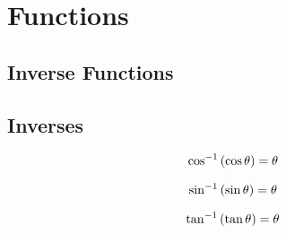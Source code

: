 \documentclass[20150903-160354-rs2.2-MarksMathNotebook.tex]{subfiles}
\begin{document}
%
%

\chapter{Functions}



\section{Inverse Functions}


\section{Inverses}


\begin{property}
\begin{subequations}
\begin{align}
\cos^{-1} \left(\cos \theta \right) = \theta \label{eq:arccos}
\end{align}
\end{subequations}
\end{property}

\begin{property}
\begin{subequations}
\begin{align}
\sin^{-1} \left(\sin \theta \right) = \theta  \label{eq:arcsin}
\end{align}
\end{subequations}
\end{property}

\begin{property}
\begin{subequations}
\begin{align}
\tan^{-1} \left(\tan \theta \right) = \theta  \label{eq:arctan}
\end{align}
\end{subequations}
\end{property}
\end{document}
